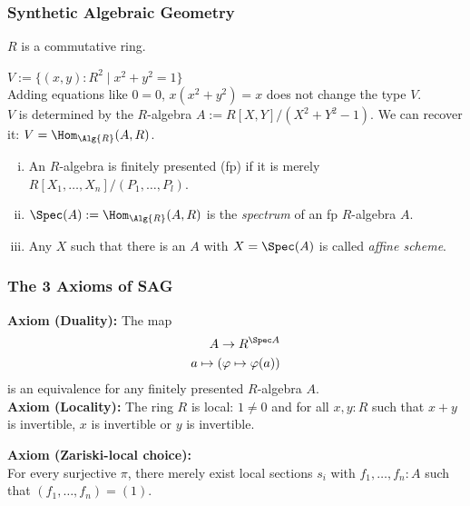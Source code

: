 \documentclass{beamer}
\begin{document}
\begin{frame}
  \frametitle{\textbf{Synthetic Algebraic Geometry}}
  \pause
  $R$ is a commutative ring. \\
  \vspace{0.4cm}
  \pause

  $V:= \{(x,y):R^2\mid x^2+y^2=1 \}$ \\

  \pause
  Adding equations like $0=0$, $x(x^2+y^2)=x$ does not change the type $V$. \\
  \pause
  $V$ is determined by the $R$-algebra $A:= R[X,Y]/(X^2+Y^2-1)$.
  \pause
  We can recover it: $V=\Hom_{\Alg{R}}(A,R)$. \\
  \vspace{0.4cm}
  \pause
  \begin{definition}
    \begin{enumerate}[(i)]
    \item An $R$-algebra is finitely presented (fp) if it is merely $R[X_1,\dots,X_n]/(P_1,\dots,P_l)$.
    \item $\Spec(A):= \Hom_{\Alg{R}}(A,R)$ is the \emph{spectrum} of an fp $R$-algebra $A$.
    \item Any $X$ such that there is an $A$ with $X=\Spec(A)$ is called \emph{affine scheme}.
    \end{enumerate}
  \end{definition}
\end{frame}

\begin{frame}
  \frametitle{The 3 Axioms of SAG}
    \textbf{Axiom (Duality):}
    The map
    \begin{align*}
      A \to R^{\Spec A} \\
      a\mapsto (\varphi\mapsto \varphi(a))
    \end{align*}
    is an equivalence
    for any finitely presented $R$-algebra $A$. \\
  \pause
  \vspace{5mm}
  \textbf{Axiom (Locality):} The ring $R$ is local:
  $1\neq 0$ and for all $x,y:R$ such that $x+y$ is invertible, $x$ is invertible or $y$ is invertible.
  
  \vspace{5mm}
  \textbf{Axiom (Zariski-local choice):}\\
  For every surjective $\pi$, there merely exist local sections $s_i$
  with $f_1, \dots, f_n : A$ such that $(f_1,\dots,f_n)=(1)$.
\end{frame}
\end{document}
